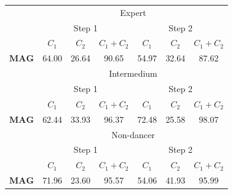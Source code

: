 \documentclass{sigchi}
\begin{document}
\begin{table}
\tiny

  \centering
  
\begin{tabular}{l c c c c c c }
\toprule



& \multicolumn{6}{c}{Expert} \\
\cmidrule(r){2-7}

& \multicolumn{3}{c}{Step 1} & \multicolumn{3}{c}{Step 2}\\
\cmidrule(lr){2-4} \cmidrule(lr){5-7}

     & $C_1$ & $C_2$  & $C_1+C_2$  & $C_1$  & $C_2$  & $C_1+C_2$  \\
\midrule

$\boldsymbol{MAG}$ &64.00 & 26.64 & \cellcolor{blue!25}90.65 & 54.97 & 32.64 & \cellcolor{blue!25}87.62 \\


& \multicolumn{6}{c}{Intermedium} \\
\cmidrule(r){2-7}

& \multicolumn{3}{c}{Step 1} & \multicolumn{3}{c}{Step 2}\\
\cmidrule(lr){2-4} \cmidrule(lr){5-7}

     & $C_1$ & $C_2$  & $C_1+C_2$  & $C_1$  & $C_2$  & $C_1+C_2$  \\
\midrule
$\boldsymbol{MAG}$ & 62.44 & 33.93 & 96.37 & 72.48 & 25.58 & \cellcolor{blue!25}98.07 \\


& \multicolumn{6}{c}{Non-dancer} \\
\cmidrule(r){2-7}

& \multicolumn{3}{c}{Step 1} & \multicolumn{3}{c}{Step 2}\\
\cmidrule(lr){2-4} \cmidrule(lr){5-7}

     & $C_1$ & $C_2$  & $C_1+C_2$  & $C_1$  & $C_2$  & $C_1+C_2$  \\
\midrule
$\boldsymbol{MAG}$ & 71.96 & 23.60 & \cellcolor{blue!25}95.57 & 54.06 & 41.93 & \cellcolor{blue!25}95.99 \\


\end{tabular}
\end{table}
\end{document}
